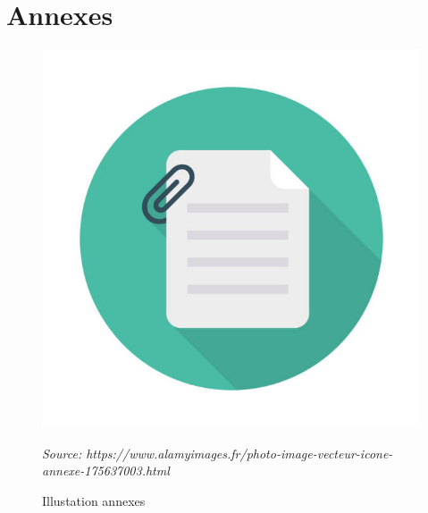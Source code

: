 \documentclass[12pt,a4paper,twoside]{article}
\newcommand{\source}[1]{\vspace{-11pt} \caption*{\small \textit{Source: {#1}} }}
\begin{document}
\clearpage
\section{Annexes}

\begin{figure}[h]
	\centering
	\includegraphics[width=0.7\linewidth]{Figures/Annexes}
	\caption{Illustation annexes}
	\label{fig:annexes}
	\source{https://www.alamyimages.fr/photo-image-vecteur-icone-annexe-175637003.html}
\end{figure}












\end{document}
